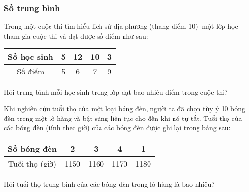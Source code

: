 \subsubsection{Số trung bình}
\begin{vd}%
	Trong một cuộc thi tìm hiểu lịch sử địa phương (thang điểm 10), một lớp học tham gia cuộc thi và đạt được số điểm như sau:
	\begin{center}
		\begin{tabular}{|c|c|c|c|c|}
			\hline
			Số học sinh & 5 & 12 & 10 & 3\\
			\hline
			Số điểm & 5 & 6 & 7 & 9\\
			\hline
		\end{tabular}
	\end{center}
	Hỏi trung bình mỗi học sinh trong lớp đạt bao nhiêu điểm trong cuộc thi?
\end{vd}
\begin{vd}%
	Khi nghiên cứu tuổi thọ của một loại bóng đèn, người ta đã chọn tùy ý 10 bóng đèn trong một lô hàng và bật sáng liên tục cho đến khi nó tự tắt. Tuổi thọ của các bóng đèn (tính theo giờ) của các bóng đèn được ghi lại trong bảng sau:
	\begin{center}
		\begin{tabular}{|c|c|c|c|c|}
			\hline
			Số bóng đèn & 2 & 3 & 4 & 1\\
			\hline
			Tuổi thọ (giờ) & 1150 & 1160 & 1170 & 1180\\
			\hline
		\end{tabular}
	\end{center}
	Hỏi tuổi thọ trung bình của các bóng đèn trong lô hàng là bao nhiêu?
\end{vd}
